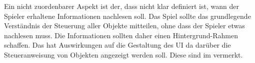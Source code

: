 Ein nicht zuordenbarer Aspekt ist der, dass nicht klar definiert ist, wann der Spieler erhaltene Informationen nachlesen soll. Das Spiel sollte das grundlegende Verständnis der Steuerung aller Objekte mitteilen, ohne dass der Spieler etwas nachlesen muss. Die Informationen sollten daher einen Hintergrund-Rahmen schaffen. Das hat Auswirkungen auf die Gestaltung des \ac{UI} da darüber die Steueranweisung von Objekten angezeigt werden soll. Diese sind im  vermerkt.































